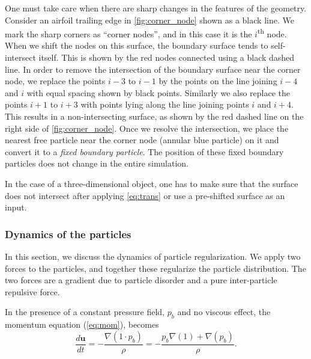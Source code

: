 \documentclass[preprint,12pt]{elsarticle}
\newcommand{\ten}[1]{\ensuremath{\mathbf{#1}}}
\begin{document}
One must take care when there are sharp changes in the features of the
geometry. Consider an airfoil trailing edge in \cref{fig:corner_node} shown
as a black line. We mark the sharp corners as ``corner nodes'', and in this
case it is the $i$\textsuperscript{th} node. When we shift the nodes on this
surface, the boundary surface tends to self-intersect itself. This is shown
by the red nodes connected using a black dashed line. In order to remove the
intersection of the boundary surface near the corner node, we replace the
points $i-3$ to $i-1$ by the points on the line joining $i-4$ and $i$ with
equal spacing shown by black points. Similarly we also replace the points
$i+1$ to $i+3$ with points lying along the line joining points $i$ and $i+4$.
This results in a non-intersecting surface, as shown by the red dashed line
on the right side of \cref{fig:corner_node}. Once we resolve the
intersection, we place the nearest free particle near the corner node
(annular blue particle) on it and convert it to a \emph{fixed boundary
particle}. The position of these fixed boundary particles does not change in
the entire simulation.

In the case of a three-dimensional object, one has to make sure that the
surface does not intersect after applying \cref{eq:trans} or use a pre-shifted
surface as an input.


\subsubsection{Dynamics of the particles}
\label{subsec:pm}

In this section, we discuss the dynamics of particle regularization.
We apply two forces to the particles, and together these regularize the
particle distribution. The two forces are a gradient due to particle
disorder and a pure inter-particle repulsive force.

In the presence of a constant pressure field, $p_b$ and no viscous effect, the
momentum equation (\cref{eq:mom}), becomes
\begin{equation}
  \label{eq:backgrounpressure}
  \frac{d \ten{u}}{dt} = -\frac{\nabla (1 \cdot p_b)}{\rho} =
  -\frac{p_b \nabla(1) + \nabla(p_b)}{\rho}.
\end{equation}
\end{document}
